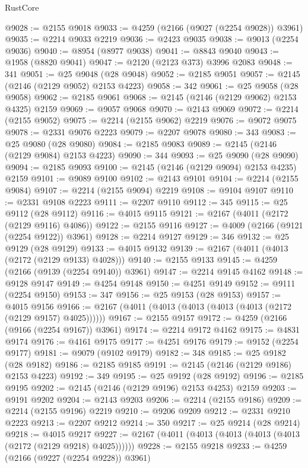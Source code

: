 \begin{lexlean}{RustCore}
\begin{coremodule}
@9028 := @2155 @9018
@9033 := @4259 (@2166 (@9027 (@2254 @9028)) @3961)
@9035 := @2214 @9033 @2219
@9036 := @2423 @9035
@9038 := @9013 (@2254 @9036)
@9040 := @8954 (@8977 @9038)
@9041 := @8843 @9040
@9043 := @1958 (@8820 @9041)
@9047 := @2120 (@2123 @373) @3996 @2083
@9048 := 341
@9051 := @25 @9048 (@28 @9048)
@9052 := @2185 @9051
@9057 := @2145 (@2146 (@2129 @9052) @2153 @4223)
@9058 := 342
@9061 := @25 @9058 (@28 @9058)
@9062 := @2185 @9061
@9068 := @2145 (@2146 (@2129 @9062) @2153 @4325) @2159
@9069 := @9057 @9068
@9070 := @2143 @9069
@9072 := @2214 (@2155 @9052)
@9075 := @2214 (@2155 @9062) @2219
@9076 := @9072 @9075
@9078 := @2331 @9076 @2223
@9079 := @2207 @9078
@9080 := 343
@9083 := @25 @9080 (@28 @9080)
@9084 := @2185 @9083
@9089 := @2145 (@2146 (@2129 @9084) @2153 @4223)
@9090 := 344
@9093 := @25 @9090 (@28 @9090)
@9094 := @2185 @9093
@9100 := @2145 (@2146 (@2129 @9094) @2153 @4235) @2159
@9101 := @9089 @9100
@9102 := @2143 @9101
@9104 := @2214 (@2155 @9084)
@9107 := @2214 (@2155 @9094) @2219
@9108 := @9104 @9107
@9110 := @2331 @9108 @2223
@9111 := @2207 @9110
@9112 := 345
@9115 := @25 @9112 (@28 @9112)
@9116 := @4015 @9115
@9121 := @2167 (@4011 (@2172 (@2129 @9116) @4086))
@9122 := @2155 @9116
@9127 := @4009 (@2166 (@9121 (@2254 @9122)) @3961)
@9128 := @2214 @9127
@9129 := 346
@9132 := @25 @9129 (@28 @9129)
@9133 := @4015 @9132
@9139 := @2167 (@4011 (@4013 (@2172 (@2129 @9133) @4028)))
@9140 := @2155 @9133
@9145 := @4259 (@2166 (@9139 (@2254 @9140)) @3961)
@9147 := @2214 @9145 @4162
@9148 := @9128 @9147
@9149 := @4254 @9148
@9150 := @4251 @9149
@9152 := @9111 (@2254 @9150)
@9153 := 347
@9156 := @25 @9153 (@28 @9153)
@9157 := @4015 @9156
@9166 := @2167 (@4011 (@4013 (@4013 (@4013 (@4013 (@2172 (@2129 @9157) @4025))))))
@9167 := @2155 @9157
@9172 := @4259 (@2166 (@9166 (@2254 @9167)) @3961)
@9174 := @2214 @9172 @4162
@9175 := @4831 @9174
@9176 := @4161 @9175
@9177 := @4251 @9176
@9179 := @9152 (@2254 @9177)
@9181 := @9079 (@9102 @9179)
@9182 := 348
@9185 := @25 @9182 (@28 @9182)
@9186 := @2185 @9185
@9191 := @2145 (@2146 (@2129 @9186) @2153 @4223)
@9192 := 349
@9195 := @25 @9192 (@28 @9192)
@9196 := @2185 @9195
@9202 := @2145 (@2146 (@2129 @9196) @2153 @4253) @2159
@9203 := @9191 @9202
@9204 := @2143 @9203
@9206 := @2214 (@2155 @9186)
@9209 := @2214 (@2155 @9196) @2219
@9210 := @9206 @9209
@9212 := @2331 @9210 @2223
@9213 := @2207 @9212
@9214 := 350
@9217 := @25 @9214 (@28 @9214)
@9218 := @4015 @9217
@9227 := @2167 (@4011 (@4013 (@4013 (@4013 (@4013 (@2172 (@2129 @9218) @4025))))))
@9228 := @2155 @9218
@9233 := @4259 (@2166 (@9227 (@2254 @9228)) @3961)

\end{coremodule}
\end{lexlean}
